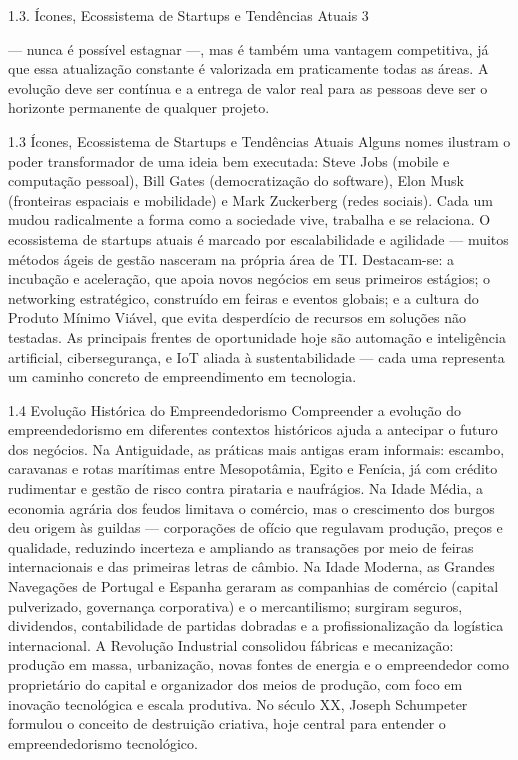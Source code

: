 1.3. Ícones, Ecossistema de Startups e Tendências Atuais 3

— nunca é possível estagnar —, mas é também uma vantagem competitiva, já que essa atualização constante é valorizada em praticamente todas as áreas. A evolução deve ser contínua e a entrega de valor real para as pessoas deve ser o horizonte permanente de qualquer projeto.

1.3 Ícones, Ecossistema de Startups e Tendências Atuais Alguns nomes ilustram o poder transformador de uma ideia bem executada: Steve Jobs (mobile e computação pessoal), Bill Gates (democratização do software), Elon Musk (fronteiras espaciais e mobilidade) e Mark Zuckerberg (redes sociais). Cada um mudou radicalmente a forma como a sociedade vive, trabalha e se relaciona. O ecossistema de startups atuais é marcado por escalabilidade e agilidade — muitos métodos ágeis de gestão nasceram na própria área de TI. Destacam-se: a incubação e aceleração, que apoia novos negócios em seus primeiros estágios; o networking estratégico, construído em feiras e eventos globais; e a cultura do Produto Mínimo Viável, que evita desperdício de recursos em soluções não testadas. As principais frentes de oportunidade hoje são automação e inteligência artificial, cibersegurança, e IoT aliada à sustentabilidade — cada uma representa um caminho concreto de empreendimento em tecnologia.

1.4 Evolução Histórica do Empreendedorismo Compreender a evolução do empreendedorismo em diferentes contextos históricos ajuda a antecipar o futuro dos negócios. Na Antiguidade, as práticas mais antigas eram informais: escambo, caravanas e rotas marítimas entre Mesopotâmia, Egito e Fenícia, já com crédito rudimentar e gestão de risco contra pirataria e naufrágios. Na Idade Média, a economia agrária dos feudos limitava o comércio, mas o crescimento dos burgos deu origem às guildas — corporações de ofício que regulavam produção, preços e qualidade, reduzindo incerteza e ampliando as transações por meio de feiras internacionais e das primeiras letras de câmbio. Na Idade Moderna, as Grandes Navegações de Portugal e Espanha geraram as companhias de comércio (capital pulverizado, governança corporativa) e o mercantilismo; surgiram seguros, dividendos, contabilidade de partidas dobradas e a profissionalização da logística internacional. A Revolução Industrial consolidou fábricas e mecanização: produção em massa, urbanização, novas fontes de energia e o empreendedor como proprietário do capital e organizador dos meios de produção, com foco em inovação tecnológica e escala produtiva. No século XX, Joseph Schumpeter formulou o conceito de destruição criativa, hoje central para entender o empreendedorismo tecnológico.

